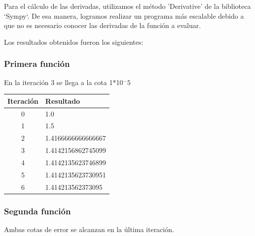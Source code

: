 \documentclass[titlepage,a4paper]{article}
\begin{document}
Para el cálculo de las derivadas, utilizamos el método 'Derivative' de la biblioteca `Sympy`. De esa manera, logramos realizar un programa más escalable debido a que no es necesario conocer las derivadas de la función a evaluar.

Los resultados obtenidos fueron los siguientes:

\subsubsection{Primera función}\label{sec:NR1}
En la iteración 3 se llega a la cota 1*10$^-5$
\begin{center}
    \begin{tabular}{| c | l |}
    \hline
     Iteración & Resultado \\ \hline
     0     &  1.0 \\
1     &  1.5 \\
2     &  1.4166666666666667 \\
3     &  1.4142156862745099 \\
4     &  1.4142135623746899 \\
5     &  1.4142135623730951 \\
6     &  1.414213562373095 \\
    \hline
    \end{tabular}
\end{center}
\subsubsection{Segunda función}\label{sec:NR2}
Ambas cotas de error se alcanzan en la última iteración.
\end{document}
